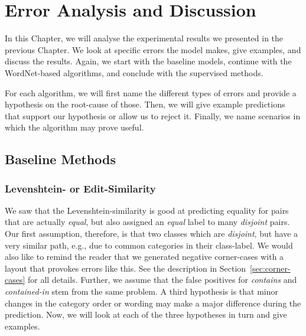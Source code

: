 \chapter{Error Analysis and Discussion}
\label{ch:error-analysis}

In this Chapter, we will analyse the experimental results we presented in the previous Chapter.
We look at specific errors the model makes, give examples, and discuss the results.
Again, we start with the baseline models, continue with the WordNet-based algorithms, and conclude with the supervised
methods.

For each algorithm, we will first name the different types of errors and provide a hypothesis on the root-cause of those.
Then, we will give example predictions that support our hypothesis or allow us to reject it.
Finally, we name scenarios in which the algorithm may prove useful.

\section{Baseline Methods}

\subsection{Levenshtein- or Edit-Similarity}

We saw that the Levenshtein-similarity is good at predicting equality for pairs that are actually \emph{equal}, but also assigned
an \emph{equal} label to many \emph{disjoint} pairs.
Our first assumption, therefore, is that two classes which are \emph{disjoint}, but have a very similar path, e.g., due to
common categories in their class-label.
We would also like to remind the reader that we generated negative corner-cases with a layout that provokes
errors like this.
See the description in Section~\ref{sec:corner-cases} for all details.
Further, we assume that the false positives for \emph{contains} and \emph{contained-in} stem from the same problem.
A third hypothesis is that minor changes in the category order or wording may make a major difference during the prediction.
Now, we will look at each of the three hypotheses in turn and give examples.

